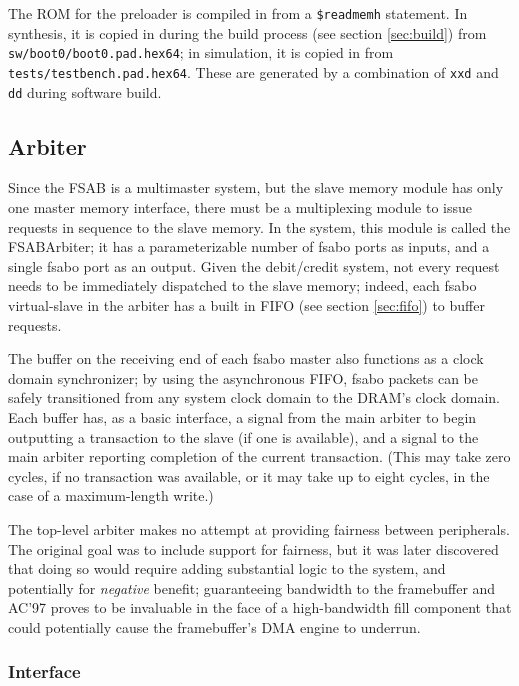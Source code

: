 \documentclass[10pt]{article}
\begin{document}
The ROM for the preloader is compiled in from a \texttt{\$readmemh}
statement.  In synthesis, it is copied in during the build process (see
section \ref{sec:build}) from \texttt{sw/boot0/boot0.pad.hex64}; in
simulation, it is copied in from \texttt{tests/testbench.pad.hex64}.  These
are generated by a combination of \texttt{xxd} and \texttt{dd} during
software build.

\subsection{Arbiter}
\label{sec:arbiter}

Since the FSAB is a multimaster system, but the slave memory module has only
one master memory interface, there must be a multiplexing module to issue
requests in sequence to the slave memory.  In the system, this module is
called the FSABArbiter; it has a parameterizable number of fsabo ports as
inputs, and a single fsabo port as an output.  Given the debit/credit
system, not every request needs to be immediately dispatched to the slave
memory; indeed, each fsabo virtual-slave in the arbiter has a built in FIFO
(see section \ref{sec:fifo}) to buffer requests.

The buffer on the receiving end of each fsabo master also functions as a
clock domain synchronizer; by using the asynchronous FIFO, fsabo packets can
be safely transitioned from any system clock domain to the DRAM's clock
domain. Each buffer has, as a basic interface, a signal from the main
arbiter to begin outputting a transaction to the slave (if one is
available), and a signal to the main arbiter reporting completion of the
current transaction. (This may take zero cycles, if no transaction was
available, or it may take up to eight cycles, in the case of a
maximum-length write.)

The top-level arbiter makes no attempt at providing fairness between
peripherals.  The original goal was to include support for fairness, but it
was later discovered that doing so would require adding substantial logic to
the system, and potentially for \textit{negative} benefit; guaranteeing
bandwidth to the framebuffer and AC'97 proves to be invaluable in the face
of a high-bandwidth fill component that could potentially cause the
framebuffer's DMA engine to underrun.

\subsubsection{Interface}
\end{document}
